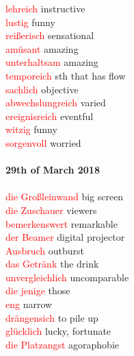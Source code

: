 \documentclass{article}
\begin{document}
\begin{multicols}{2}
	\textcolor{red}{lehreich} instructive \\
	\textcolor{red}{lustig} funny\\
	\textcolor{red}{reißerisch} sensational \\
	\textcolor{red}{amüsant} amazing\\
	\textcolor{red}{unterhaltsam} amazing \\ 
	\textcolor{red}{temporeich} sth that has flow \\
	\textcolor{red}{sachlich} objective\\
	\textcolor{red}{abwechslungreich} varied\\
	\textcolor{red}{ereignisreich} eventful\\ 
	\textcolor{red}{witzig} funny\\
	\textcolor{red}{sorgenvoll} worried\\\\
	
	\textbf{29th of March 2018}\\\\
	\textcolor{red}{die Großleinwand} big screen\\
	\textcolor{red}{die Zuschauer} viewers\\
	\textcolor{red}{bemerkenswert} remarkable\\
	\textcolor{red}{der Beamer} digital projector\\
	\textcolor{red}{Ausbruch} outburst\\
	\textcolor{red}{das Getränk} the drink\\
	\textcolor{red}{unvergleichlich} uncomparable\\
	\textcolor{red}{die jenige} those\\
	\textcolor{red}{eng} narrow\\
	\textcolor{red}{drängensich} to pile up \\
	\textcolor{red}{glücklich} lucky, fortunate\\
	\textcolor{red}{die Platzangst} agoraphobie\\
	
	
	
	
	
	
	
	
	
	\end{multicols}

	\printglossaries
	
\end{document}

